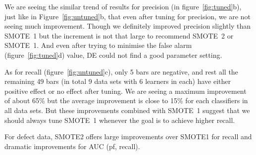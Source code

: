 We are seeing the similar trend of results for precision (in figure~\ref{fig:tuned}b), just like in Figure~\ref{fig:untuned}b, that even after tuning for precision, we are not seeing much improvement. Though we definitely improved precision slightly than SMOTE~1 but the increment is not that large to recommend SMOTE~2 or SMOTE~1. And even after trying to minimise the false alarm (figure~\ref{fig:tuned}d) value, DE could not find a good parameter setting.

As for recall (figure~\ref{fig:untuned}c), only 5 bars are negative, and rest all the remaining 49 bars (in total 9 data sets with 6 learners in each) have either positive effect or no effect after tuning. We are seeing a maximum improvement of about 65\% but the average improvement is close to 15\% for each classifiers in all data sets. But these improvements combined with SMOTE~1 suggest that we should always tune SMOTE~1 whenever the goal is to achieve higher recall.

\begin{lesson1}
    For defect data, SMOTE2  
 offers   large  improvements over SMOTE1 for recall
 and dramatic improvements for AUC (pf, recall).
\end{lesson1}

